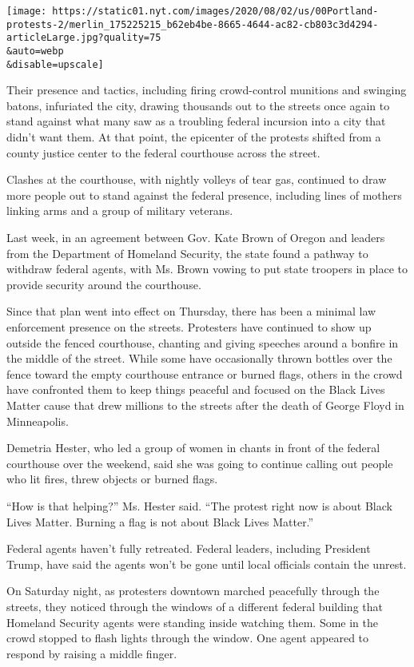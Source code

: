 \texttt{[image: https://static01.nyt.com/images/2020/08/02/us/00Portland-protests-2/merlin\_175225215\_b62eb4be-8665-4644-ac82-cb803c3d4294-articleLarge.jpg?quality=75\\\&auto=webp\\\&disable=upscale]}

Their presence and tactics, including firing crowd-control munitions and
swinging batons, infuriated the city, drawing thousands out to the
streets once again to stand against what many saw as a troubling federal
incursion into a city that didn't want them. At that point, the
epicenter of the protests shifted from a county justice center to the
federal courthouse across the street.

Clashes at the courthouse, with nightly volleys of tear gas, continued
to draw more people out to stand against the federal presence, including
lines of mothers linking arms and a group of military veterans.

Last week, in an agreement between Gov. Kate Brown of Oregon and leaders
from the Department of Homeland Security, the state found a pathway to
withdraw federal agents, with Ms. Brown vowing to put state troopers in
place to provide security around the courthouse.

Since that plan went into effect on Thursday, there has been a minimal
law enforcement presence on the streets. Protesters have continued to
show up outside the fenced courthouse, chanting and giving speeches
around a bonfire in the middle of the street. While some have
occasionally thrown bottles over the fence toward the empty courthouse
entrance or burned flags, others in the crowd have confronted them to
keep things peaceful and focused on the Black Lives Matter cause that
drew millions to the streets after the death of George Floyd in
Minneapolis.

Demetria Hester, who led a group of women in chants in front of the
federal courthouse over the weekend, said she was going to continue
calling out people who lit fires, threw objects or burned flags.

``How is that helping?'' Ms. Hester said. ``The protest right now is
about Black Lives Matter. Burning a flag is not about Black Lives
Matter.''

Federal agents haven't fully retreated. Federal leaders, including
President Trump, have said the agents won't be gone until local
officials contain the unrest.

On Saturday night, as protesters downtown marched peacefully through the
streets, they noticed through the windows of a different federal
building that Homeland Security agents were standing inside watching
them. Some in the crowd stopped to flash lights through the window. One
agent appeared to respond by raising a middle finger.

